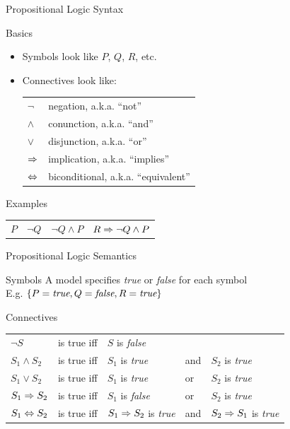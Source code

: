\documentclass[14pt]{beamer}
\begin{document}
\begin{frame}{Propositional Logic Syntax}
\begin{block}{Basics}
\begin{itemize}
\item Symbols look like $P$, $Q$, $R$, etc.
\item Connectives look like:\\[0.5em]
\begin{tabular}{ll}
$\lnot$  & negation, a.k.a. ``not'' \\
$\land$  & conunction, a.k.a. ``and'' \\
$\lor$   & disjunction, a.k.a. ``or'' \\
$\Rightarrow$ & implication, a.k.a. ``implies'' \\
$\Leftrightarrow$  & biconditional, a.k.a. ``equivalent''
\end{tabular}
\end{itemize}
\end{block}
\pause
\begin{block}{Examples}
\setlength{\tabcolsep}{1.5em}
\begin{tabular}{ l l l l }
$P$ &
$\lnot Q$ &
$\lnot Q \land P$ &
$R \Rightarrow \lnot Q \land P$
\end{tabular}
\end{block}
\end{frame}

\begin{frame}{Propositional Logic Semantics}
	\begin{block}{Symbols}
		A model specifies \emph{true} or \emph{false} for each symbol \\
		\hspace{1em} E.g. $\{P=\mbox{\em true}, Q=\mbox{\em false}, R=\mbox{\em true}\}$
	\end{block}
	\pause
	\begin{block}{Connectives}
		\small
		\begin{tabular}{@{}lllll}
			$\lnot S$         & is true iff & $S$ is \emph{false} \\
			$S_1 \land S_2$   & is true iff & $S_1$ is \emph{true}            & and & $S_2$ is \emph{true} \\
			$S_1 \lor S_2$    & is true iff & $S_1$ is \emph{true}            & or  & $S_2$ is \emph{true} \\
			$S_1 \Rightarrow S_2$  & is true iff & $S_1$ is \emph{false}           & or  & $S_2$ is \emph{true} \\
			$S_1 \Leftrightarrow S_2$   & is true iff & $S_1 \Rightarrow S_2$ is \emph{true} & and & $S_2 \Rightarrow S_1$ is \emph{true}
		\end{tabular}
	\end{block}
\end{frame}
\end{document}
